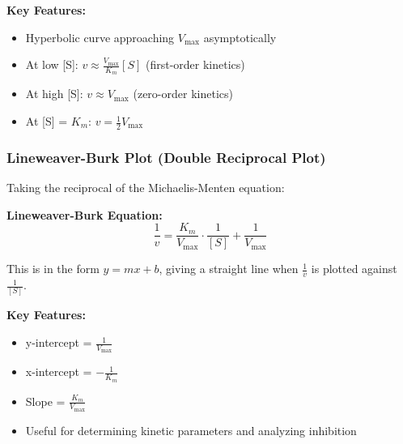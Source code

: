 \textbf{Key Features:}
\begin{itemize}
    \item Hyperbolic curve approaching $V_{\max}$ asymptotically
    \item At low [S]: $v \approx \frac{V_{\max}}{K_m}[S]$ (first-order kinetics)
    \item At high [S]: $v \approx V_{\max}$ (zero-order kinetics)
    \item At [S] = $K_m$: $v = \frac{1}{2}V_{\max}$
\end{itemize}

\subsubsection{Lineweaver-Burk Plot (Double Reciprocal Plot)}

Taking the reciprocal of the Michaelis-Menten equation:

\begin{theorem}
\textbf{Lineweaver-Burk Equation:}
\[
\frac{1}{v} = \frac{K_m}{V_{\max}} \cdot \frac{1}{[S]} + \frac{1}{V_{\max}}
\]

This is in the form $y = mx + b$, giving a straight line when $\frac{1}{v}$ is plotted against $\frac{1}{[S]}$.
\end{theorem}

\begin{center}
\end{center}

\textbf{Key Features:}
\begin{itemize}
    \item y-intercept = $\frac{1}{V_{\max}}$
    \item x-intercept = $-\frac{1}{K_m}$
    \item Slope = $\frac{K_m}{V_{\max}}$
    \item Useful for determining kinetic parameters and analyzing inhibition
\end{itemize}

